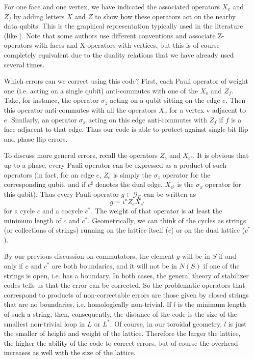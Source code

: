 \documentclass[a4paper, draft]{article}
\theoremstyle{own}
\theoremstyle{remark}
\begin{document}
For one face and one vertex, we have indicated the associated operators $X_v$ and $Z_f$ by adding letters $X$ and $Z$ to show how these operators act on the nearby data qubits. This is the graphical representation typically used in the literature (like \cite{SurfaceCodes}). Note that some authors use different conventions and associate Z-operators with faces and X-operators with vertices, but this is of course completely equivalent due to the duality relations that we have already used several times.


Which errors can we correct using this code? First, each Pauli operator of weight one (i.e. acting on a single qubit) anti-commutes with one of the $X_v$ and $Z_f$. Take, for instance, the operator $\sigma_z$ acting on a qubit sitting on the edge $e$. Then this operator anti-commutes with all the operators $X_v$ for a vertex v adjacent to $e$. Similarly, an operator $\sigma_x$ acting on this edge anti-commutes with $Z_f$ if $f$ is a face adjacent to that edge. Thus our code is able to protect against single bit flip and phase flip errors.

To discuss more general errors, recall the operators $Z_c$ and $X_{c^*}$. It is obvious that up to a phase, every Pauli operator can be expressed as a product of such operators (in fact, for an edge $e$, $Z_e$ is simply the $\sigma_z$ operator for the corresponding qubit, and if $e^\sharp$ denotes the dual edge, $X_{e^\sharp}$ is the $\sigma_x$ operator for this qubit). Thus every Pauli operator $g \in \mathcal{G}_E$ can be written as
$$
g = i^a  Z_c X_{c^*}
$$
for a cycle $c$ and a cocycle $c^*$. The weight of that operator is at least the minimum length of $c$ and $c^*$. Geometrically, we can think of the cycles as strings (or collections of strings) running on the lattice itself ($c$) or on the dual lattice ($c^*$).

By our previous discussion on commutators, the element $g$ will be in $S$ if and only if $c$ and $c^*$ are both boundaries, and it will not be in $N(S)$ if one of the strings is open, i.e. has a boundary. In both cases, the general theory of stabilizer codes tells us that the error can be corrected. So the problematic operators that correspond to products of non-correctable errors are those given by closed strings that are no boundaries, i.e. homologically non-trivial. If $l$ is the minimum length of such a string, then, consequently, the distance of the code is the size of the smallest non-trivial loop in $L$ or $L^*$. Of course, in our toroidal geometry, $l$ is just the smaller of height and weight of the lattice. Therefore the larger the lattice, the higher the ability of the code to correct errors, but of course the overhead increases as well with the size of the lattice. 
\end{document}
